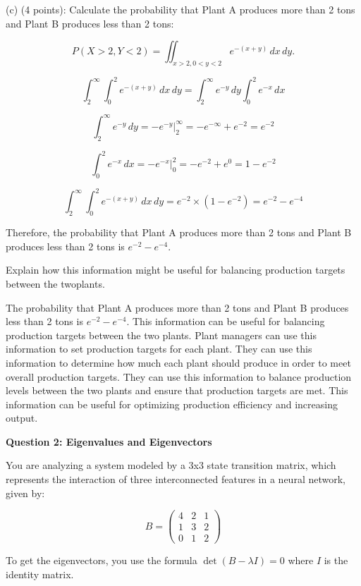 \documentclass{article}
\begin{document}
(c) (4 points): Calculate the probability that Plant A produces more than 2 tons and Plant B
produces less than 2 tons:

\[P(X > 2, Y < 2) =\iint_{x > 2, 0 < y < 2} e^{-(x+y)} \, dx \, dy.\]

\[\int_{2}^{\infty}\int_{0}^{2}e^{-(x+y)} \, dx \, dy = \int_{2}^{\infty}e^{-y} \, dy \int_{0}^{2}e^{-x} \, dx\]

\[\int_{2}^{\infty}e^{-y} \, dy = -e^{-y}\Big|_{2}^{\infty} = -e^{-\infty} + e^{-2} = e^{-2}\]

\[\int_{0}^{2}e^{-x} \, dx = -e^{-x}\Big|_{0}^{2} = -e^{-2} + e^{0} = 1 - e^{-2}\]

\[\int_{2}^{\infty}\int_{0}^{2}e^{-(x+y)} \, dx \, dy = e^{-2} \times (1 - e^{-2}) = e^{-2} - e^{-4}\]

Therefore, the probability that Plant A produces more than 2 tons and Plant B produces less than 2 tons is \(e^{-2} - e^{-4}\).

Explain how this information might be useful for balancing production targets between the twoplants.

The probability that Plant A produces more than 2 tons and Plant B produces less than 2 tons is \(e^{-2} - e^{-4}\). This information can be useful for balancing production targets between the two plants. Plant managers can use this information to set production targets for each plant. They can use this information to determine how much each plant should produce in order to meet overall production targets. They can use this information to balance production levels between the two plants and ensure that production targets are met. This information can be useful for optimizing production efficiency and increasing output.



\begin{center}
    \large \textbf{Question 2: Eigenvalues and Eigenvectors}
\end{center}
You are analyzing a system modeled by a 3x3 state transition matrix, which represents the interaction
of three interconnected features in a neural network, given by:

\[
B =
\begin{pmatrix}
4 & 2 & 1 \\
1 & 3 & 2 \\
0 & 1 & 2
\end{pmatrix}
\]

To get the eigenvectors, you use the formula \(\det(B - \lambda I) = 0\) where \(I\) is the identity matrix.
\end{document}
